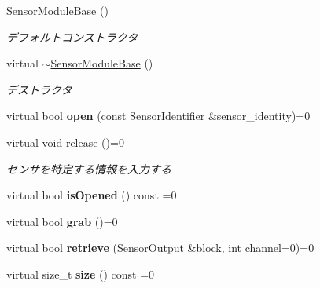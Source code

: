 \begin{DoxyCompactItemize}
\item 
\hypertarget{classskl_1_1_sensor_module_base_a8213e3bf9ad18d02f3c337778c0efcc9}{}\label{classskl_1_1_sensor_module_base_a8213e3bf9ad18d02f3c337778c0efcc9} 
\hyperlink{classskl_1_1_sensor_module_base_a8213e3bf9ad18d02f3c337778c0efcc9}{Sensor\+Module\+Base} ()
\begin{DoxyCompactList}\small\item\em デフォルトコンストラクタ \end{DoxyCompactList}\item 
\hypertarget{classskl_1_1_sensor_module_base_a4428b6576cf9a39602e7c39a426e3d4d}{}\label{classskl_1_1_sensor_module_base_a4428b6576cf9a39602e7c39a426e3d4d} 
virtual \hyperlink{classskl_1_1_sensor_module_base_a4428b6576cf9a39602e7c39a426e3d4d}{$\sim$\+Sensor\+Module\+Base} ()
\begin{DoxyCompactList}\small\item\em デストラクタ \end{DoxyCompactList}\item 
\hypertarget{classskl_1_1_sensor_module_base_a3223343241ddd34b1f8907f42b2a0d6a}{}\label{classskl_1_1_sensor_module_base_a3223343241ddd34b1f8907f42b2a0d6a} 
virtual bool {\bfseries open} (const Sensor\+Identifier \&sensor\+\_\+identity)=0
\item 
\hypertarget{classskl_1_1_sensor_module_base_a805c5f64e8ae55d8c527721375743d85}{}\label{classskl_1_1_sensor_module_base_a805c5f64e8ae55d8c527721375743d85} 
virtual void \hyperlink{classskl_1_1_sensor_module_base_a805c5f64e8ae55d8c527721375743d85}{release} ()=0
\begin{DoxyCompactList}\small\item\em センサを特定する情報を入力する \end{DoxyCompactList}\item 
\hypertarget{classskl_1_1_sensor_module_base_a6a4cecc0f591af492330813426f12628}{}\label{classskl_1_1_sensor_module_base_a6a4cecc0f591af492330813426f12628} 
virtual bool {\bfseries is\+Opened} () const =0
\item 
\hypertarget{classskl_1_1_sensor_module_base_a3dee53d8543854395b2edee7cd68e758}{}\label{classskl_1_1_sensor_module_base_a3dee53d8543854395b2edee7cd68e758} 
virtual bool {\bfseries grab} ()=0
\item 
\hypertarget{classskl_1_1_sensor_module_base_a84068667782c55d332bd3ef66074cd28}{}\label{classskl_1_1_sensor_module_base_a84068667782c55d332bd3ef66074cd28} 
virtual bool {\bfseries retrieve} (Sensor\+Output \&block, int channel=0)=0
\item 
\hypertarget{classskl_1_1_sensor_module_base_a5f28cf35150919e40fda9a4b2f6e7523}{}\label{classskl_1_1_sensor_module_base_a5f28cf35150919e40fda9a4b2f6e7523} 
virtual size\+\_\+t {\bfseries size} () const =0
\end{DoxyCompactItemize}


